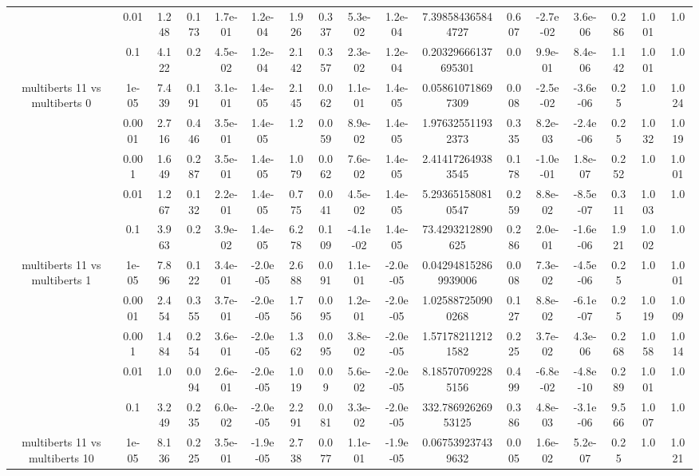 \begin{tabular}{|c|c|c|c|c|c|c|c|c|c|c|c|c|c|c|c|c|}
 & 0.01 & 1.248 & 0.173 & 1.7e-01 & 1.2e-04 & 1.926 & 0.337 & 5.3e-02 & 1.2e-04 & 7.398584365844727 & 0.607 & -2.7e-02 & 3.6e-06 & 0.286 & 1.001 & 1.0 \\
 & 0.1 & 4.122 & 0.2 & 4.5e-02 & 1.2e-04 & 2.142 & 0.357 & 2.3e-02 & 1.2e-04 & 0.20329666137695301 & 0.0 & 9.9e-01 & 8.4e-06 & 1.142 & 1.001 & 1.0 \\
\hline
\multirow{5}{*}{multiberts 11 vs multiberts 0} & 1e-05 & 7.439 & 0.191 & 3.1e-01 & 1.4e-05 & 2.145 & 0.062 & 1.1e-01 & 1.4e-05 & 0.058610718697309 & 0.008 & -2.5e-02 & -3.6e-06 & 0.25 & 1.0 & 1.024 \\
 & 0.0001 & 2.716 & 0.446 & 3.5e-01 & 1.4e-05 & 1.2 & 0.059 & 8.9e-02 & 1.4e-05 & 1.976325511932373 & 0.335 & 8.2e-03 & -2.4e-06 & 0.25 & 1.032 & 1.019 \\
 & 0.001 & 1.649 & 0.287 & 3.5e-01 & 1.4e-05 & 1.079 & 0.062 & 7.6e-02 & 1.4e-05 & 2.414172649383545 & 0.178 & -1.0e-01 & 1.8e-07 & 0.252 & 1.0 & 1.001 \\
 & 0.01 & 1.267 & 0.132 & 2.2e-01 & 1.4e-05 & 0.775 & 0.041 & 4.5e-02 & 1.4e-05 & 5.293651580810547 & 0.259 & 8.8e-02 & -8.5e-07 & 0.311 & 1.003 & 1.0 \\
 & 0.1 & 3.963 & 0.2 & 3.9e-02 & 1.4e-05 & 6.278 & 0.109 & -4.1e-02 & 1.4e-05 & 73.4293212890625 & 0.286 & 2.0e-01 & -1.6e-06 & 1.921 & 1.002 & 1.0 \\
\hline
\multirow{5}{*}{multiberts 11 vs multiberts 1} & 1e-05 & 7.896 & 0.122 & 3.4e-01 & -2.0e-05 & 2.688 & 0.091 & 1.1e-01 & -2.0e-05 & 0.042948152869939006 & 0.008 & 7.3e-02 & -4.5e-06 & 0.25 & 1.0 & 1.001 \\
 & 0.0001 & 2.454 & 0.355 & 3.7e-01 & -2.0e-05 & 1.756 & 0.095 & 1.2e-01 & -2.0e-05 & 1.025887250900268 & 0.127 & 8.8e-02 & -6.1e-07 & 0.25 & 1.019 & 1.009 \\
 & 0.001 & 1.484 & 0.254 & 3.6e-01 & -2.0e-05 & 1.362 & 0.095 & 3.8e-02 & -2.0e-05 & 1.571782112121582 & 0.225 & 3.7e-02 & 4.3e-06 & 0.268 & 1.058 & 1.014 \\
 & 0.01 & 1.0 & 0.094 & 2.6e-01 & -2.0e-05 & 1.019 & 0.09 & 5.6e-02 & -2.0e-05 & 8.185707092285156 & 0.499 & -6.8e-02 & -4.8e-10 & 0.289 & 1.001 & 1.0 \\
 & 0.1 & 3.249 & 0.235 & 6.0e-02 & -2.0e-05 & 2.291 & 0.081 & 3.3e-02 & -2.0e-05 & 332.78692626953125 & 0.386 & 4.8e-03 & -3.1e-06 & 9.566 & 1.007 & 1.0 \\
\hline
\multirow{5}{*}{multiberts 11 vs multiberts 10} & 1e-05 & 8.136 & 0.225 & 3.5e-01 & -1.9e-05 & 2.738 & 0.077 & 1.1e-01 & -1.9e-05 & 0.067539237439632 & 0.005 & 1.6e-02 & 5.2e-07 & 0.25 & 1.0 & 1.021 \\

\end{tabular}
